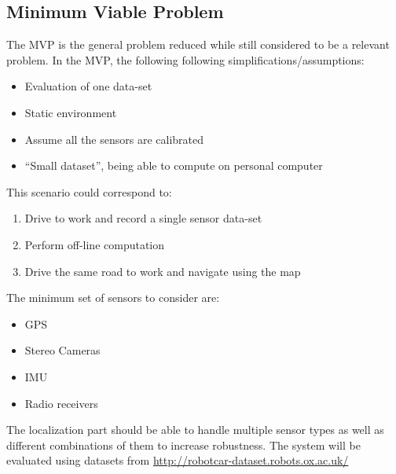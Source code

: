 \subsection{Minimum Viable Problem}

The \gls{MVP} is the general problem reduced while still considered to be a relevant problem. In the \gls{MVP}, the following following simplifications/assumptions:
\begin{itemize}
\item Evaluation of one data-set
\item Static environment
\item Assume all the sensors are calibrated
\item ``Small dataset'', being able to compute on personal computer
\end{itemize}
This scenario could correspond to:
\begin{enumerate}
\item Drive to work and record a single sensor data-set
\item Perform off-line computation
\item Drive the same road to work and navigate using the map
\end{enumerate}
The minimum set of sensors to consider are:
\begin{itemize}
\item GPS
\item Stereo Cameras
\item IMU
\item Radio receivers
\end{itemize}

The localization part should be able to handle multiple sensor types as well as different combinations of them to increase robustness. The system will be evaluated using datasets from
\url{http://robotcar-dataset.robots.ox.ac.uk/}

